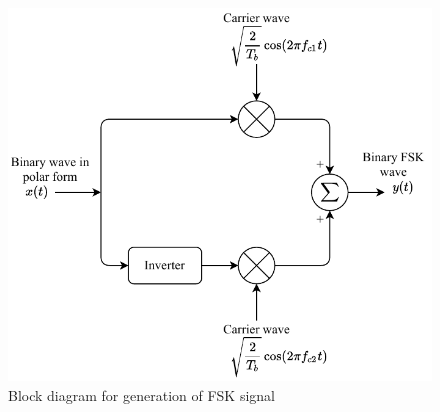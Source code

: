 \documentclass{lab_sheet}
\begin{document}
\begin{figure}[H]
    \centering
    \includegraphics[scale=0.8]{../Figures/fsk_block}
    \caption{Block diagram for generation of FSK signal}
    \label{fig:fsk_block}
\end{figure}
\end{document}
